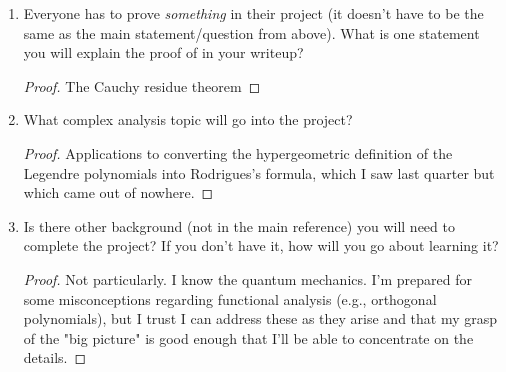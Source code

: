 \documentclass[../finalProject.tex]{subfiles}
\begin{document}
\begin{enumerate}[label={\textbf{\arabic*.}}]
\begin{proof}
        Where do the various formulas for the Hermite and Legendre polynomials come from? These two cases hold particular interest for me because of the time I've spent working with them in my quantum mechanics coursework without ever knowing where they come from. I'm very much a bottom-up learner, so I'm super excited to finally explore their origins from the simple to the complex, no pun intended.
    \end{proof}
    \item Everyone has to prove \emph{something} in their project (it doesn't have to be the same as the main statement/question from above). What is one statement you will explain the proof of in your writeup?
    \begin{proof}
        The Cauchy residue theorem
    \end{proof}
    \item What complex analysis topic will go into the project?
    \begin{proof}
        Applications to converting the hypergeometric definition of the Legendre polynomials into Rodrigues's formula, which I saw last quarter but which came out of nowhere.
    \end{proof}
    \item Is there other background (not in the main reference) you will need to complete the project? If you don't have it, how will you go about learning it?
    \begin{proof}
        Not particularly. I know the quantum mechanics. I'm prepared for some misconceptions regarding functional analysis (e.g., orthogonal polynomials), but I trust I can address these as they arise and that my grasp of the "big picture" is good enough that I'll be able to concentrate on the details.
    \end{proof}
\end{enumerate}
\newpage



\printbibliography
\end{document}
